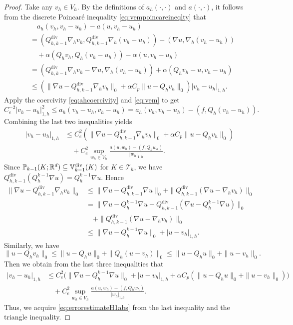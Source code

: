 \documentclass[10pt]{amsart}
\renewcommand{\div}{\operatorname{div}}
\numberwithin{equation}{section}
\begin{document}
\begin{proof}
Take any $v_h\in V_h$. 
By the definitions of $a_h(\cdot, \cdot)$ and $a(\cdot, \cdot)$, it follows from the discrete Poincar\'e inequality \eqref{eq:vempoincareineqlty} that
\begin{align*}
&\quad a_h(v_h, v_h-u_h)-a(u,v_h-u_h)\\
&=(Q_{h,k-1}^{\div}\nabla_h v_h, Q_{h,k-1}^{\div}\nabla_h(v_h-u_h))-(\nabla u, \nabla_h(v_h-u_h))\\
&\quad +\alpha(Q_hv_h, Q_h(v_h-u_h))-\alpha(u, v_h-u_h) \\
&=(Q_{h,k-1}^{\div}\nabla_h v_h-\nabla u, \nabla_h(v_h-u_h))+\alpha(Q_hv_h-u,v_h-u_h)\\
&\leq (\|\nabla u-Q_{h,k-1}^{\div}\nabla_h v_h\|_0+\alpha C_p\|u-Q_hv_h\|_0)|v_h-u_h|_{1,h}.
\end{align*}
Apply the coercivity \eqref{eq:ahcoercivity} and \eqref{eq:vem} to get
\begin{equation*}
C_e^{-2}|v_h-u_h|_{1,h}^2\leq a_h(v_h-u_h, v_h-u_h)=a_h(v_h, v_h-u_h)-(f, Q_h(v_h-u_h)).
\end{equation*}
Combining the last two inequalities yields
\begin{align*}
|v_h-u_h|_{1,h}&\leq C_e^2(\|\nabla u-Q_{h,k-1}^{\div}\nabla_h v_h\|_0+\alpha C_p\|u-Q_hv_h\|_0) \\
&\quad + C_e^2\sup_{w_h\in V_h}\frac{a(u,w_h)-(f, Q_hw_h)}{|w_h|_{1,h}}.
\end{align*}
Since $\mathbb P_{k-1}(K;\mathbb R^d)\subseteq\mathbb{V}_{k-1}^{\rm div}(K)$ for $K\in\mathcal T_h$, we have $Q_{h,k-1}^{\div}(Q_h^{k-1}\nabla u)=Q_h^{k-1}\nabla u$. Hence
\begin{align*}    
\|\nabla u-Q_{h,k-1}^{\div}\nabla_h v_h\|_0&\leq \|\nabla u-Q_{h,k-1}^{\div}\nabla u\|_0+\|Q_{h,k-1}^{\div}(\nabla u-\nabla_h v_h)\|_0\\
&= \|\nabla u-Q_h^{k-1}\nabla u-Q_{h,k-1}^{\div}(\nabla u-Q_h^{k-1}\nabla u)\|_0\\
&\quad+\|Q_{h,k-1}^{\div}(\nabla u-\nabla_h v_h)\|_0 \\
&\leq \|\nabla u-Q_h^{k-1}\nabla u\|_0+|u-v_h|_{1,h}.
\end{align*}
Similarly, we have
\[
\|u-Q_hv_h\|_0\leq \|u-Q_hu\|_0+\|Q_h(u-v_h)\|_0\leq \|u-Q_hu\|_0+\|u-v_h\|_0.
\]
Then we obtain from the last three inequalities that
\begin{align*}
|v_h-u_h|_{1,h}&\leq C_e^2\big(\|\nabla u-Q_h^{k-1}\nabla u\|_0+|u-v_h|_{1,h}+\alpha C_p(\|u-Q_hu\|_0+\|u-v_h\|_0)\big) \\
&\quad + C_e^2\sup_{w_h\in V_h}\frac{a(u,w_h)-(f, Q_hw_h)}{|w_h|_{1,h}}.
\end{align*}
Thus, we acquire \eqref{eq:errorestimateH1abs} from the last inequality and the triangle inequality.


\end{proof}
\end{document}
